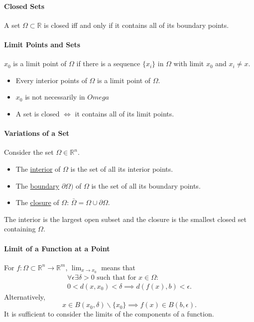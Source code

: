 \documentclass[12pt, letterpaper]{article}
\begin{document}
    \paragraph{Closed Sets}
    A set \(\Omega \subset \mathbb{R}\) is closed iff and only if it contains all of its boundary points.

    \paragraph{Limit Points and Sets}
    \(x_0\) is a limit point of \(\Omega\) if there is a sequence \(\{x_i\}\) 
    in \(\Omega\) with limit \(x_0\) and \(x_i \neq x\).

    \begin{itemize}
        \item Every interior points of \(\Omega\) is a limit point of \(\Omega\).
        \item \(x_0\) is not necessarily in \(Omega\)
        \item A set is closed \(\Leftrightarrow\) it contains all of its limit points.
    \end{itemize}
    
    \paragraph{Variations of a Set}
    Consider the set \(\Omega \in \mathbb{R}^n\).
    \begin{itemize}
        \item The \underline{interior} of \(\Omega\) is the set of all its interior points.
        \item The \underline{boundary} \(\partial \Omega)\) of \(\Omega\) is the set of all its boundary points.
        \item The \underline{closure} of \(\Omega\): \(\bar{\Omega} = \Omega \cup \partial \Omega\).
    \end{itemize}
    The interior is the largest open subset and the closure is the smallest closed set containing \(\Omega\).

    \paragraph{Limit of a Function at a Point}
    For \(f: \Omega \subset \mathbb{R}^n \to \mathbb{R}^m\), 
    \(\lim_{x\to x_0}\) means that 
    \begin{align*}
        \forall \epsilon \exists \delta > 0\text{ such that for } x\in\Omega: \\
        0 < d(x, x_0) < \delta \implies d(f(x), b) < \epsilon.
    \end{align*}
    Alternatively,
    \[
        x\in B(x_0, \delta) \backslash \{x_0\}
        \implies f(x)\in B(b, \epsilon).
    \]
    It is sufficient to consider the limits of the components of a function.
\end{document}
